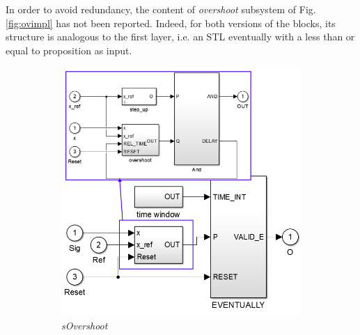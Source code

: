 In order to avoid redundancy, the content of \textit{overshoot} subsystem of Fig.\ref{fig:ovimpl} has not been reported. Indeed, for both versions of the blocks, its structure is analogous to the first layer, i.e. an STL eventually with a less than or equal to proposition as input. 
\begin{figure}[!h]
\centering
\begin{subfigure}[b]{.48\textwidth}
\centering
\includegraphics[width=\textwidth]{Figs/sovimpl.png}
\caption{\textit{sOvershoot}}
\end{subfigure}
\begin{subfigure}[b]{.48\textwidth}
\centering

\end{subfigure}
\end{figure}
